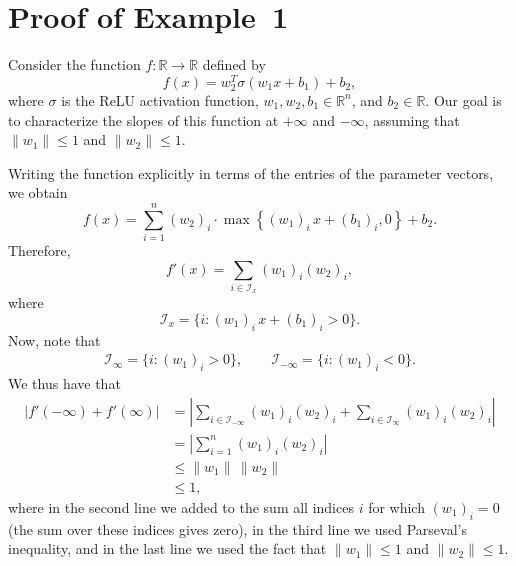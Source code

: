 \appendix

\section{Proof of Example~1}
Consider the function $f:\mathbb{R}\rightarrow\mathbb{R}$ defined by
\begin{equation}
	f(x)=w_2^T \sigma(w_1 x + b_1) + b_2,
\end{equation}
where $\sigma$ is the ReLU activation function, $w_1,w_2,b_1\in\mathbb{R}^n$, and $b_2\in\mathbb{R}$. Our goal is to characterize the slopes of this function at $+\infty$ and $-\infty$, assuming that $\|w_1\|\leq 1$ and $\|w_2\|\leq 1$.

Writing the function explicitly in terms of the entries of the parameter vectors, we obtain
\begin{equation}
f(x)=\sum_{i=1}^n (w_2)_i \cdot\max\left\{(w_1)_i\, x + (b_1)_i,0\right\} + b_2.
\end{equation}
Therefore, 
\begin{equation}
f'(x)=\sum_{i\in\mathcal{I}_x}(w_1)_i (w_2)_i,
\end{equation}
where
\begin{equation}
\mathcal{I}_x=\{i:(w_1)_i\,x+(b_1)_i>0\}.
\end{equation}
Now, note that 
\begin{align}
\mathcal{I}_\infty=\{i:(w_1)_i>0\}, \qquad
\mathcal{I}_{-\infty}=\{i:(w_1)_i<0\}.
\end{align}
We thus have that
\begin{align}
|f'(-\infty) + f'(\infty)| &= \left|\sum_{i\in\mathcal{I}_{-\infty}}(w_1)_i (w_2)_i + \sum_{i\in\mathcal{I}_{\infty}}(w_1)_i (w_2)_i\right| \nonumber\\
&= \left|\sum_{i=1}^n(w_1)_i (w_2)_i\right| \nonumber\\
&\leq  \|w_1\|\, \|w_2\| \nonumber\\
&\leq 1,
\end{align}
where in the second line we added to the sum all indices $i$ for which $(w_1)_i=0$ (the sum over these indices gives zero), in the third line we used Parseval's inequality, and in the last line we used the fact that $\|w_1\|\leq 1$ and $\|w_2\|\leq 1$.


